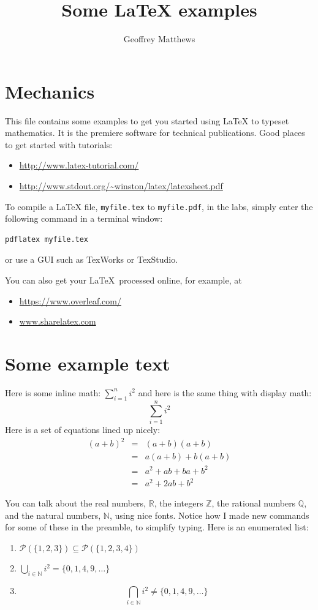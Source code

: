 \documentclass{article}
\title{Some \LaTeX{}  examples}
\author{Geoffrey Matthews}
\newcommand{\R}{\mathbb{R}}
\newcommand{\N}{\mathbb{N}}
\begin{document}
\maketitle

\section{Mechanics}
This file contains some examples to get you started using \LaTeX{} to
typeset mathematics.  It is the premiere software for technical
publications.  Good places to get started with tutorials:
\begin{itemize}
\item \url{http://www.latex-tutorial.com/}
\item \url{http://www.stdout.org/~winston/latex/latexsheet.pdf}
\end{itemize}

To compile a \LaTeX{} file, {\tt myfile.tex} to {\tt myfile.pdf}, 
in the labs, simply enter the
following command in a terminal window:
\begin{Verbatim}[frame=single]
pdflatex myfile.tex
\end{Verbatim}
or use a GUI such as TexWorks or TexStudio.

You can also get your \LaTeX\ processed online, for example, at
\begin{itemize}
\item \url{https://www.overleaf.com/}
\item \url{www.sharelatex.com}
\end{itemize}


\section{Some example text}
Here is some inline math:  $\sum_{i=1}^{n} i^2$ and
here is the same thing with display math:
\[
\sum_{i=1}^{n} i^2
\]
Here is a set of equations lined up nicely:
\begin{eqnarray*}
(a+b)^2 &=& (a+b)(a+b) \\
        &=& a(a+b) + b(a+b) \\
        &=& a^2 + ab + ba + b^2 \\
        &=& a^2 + 2ab + b^2
\end{eqnarray*}

You can talk about the real numbers, $\R$, the integers $\mathbb{Z}$, the
rational numbers $\mathbb{Q}$, and the natural numbers,
$\N$, using nice fonts.  Notice how I made new commands for some of these in
the preamble, to simplify typing.
Here is an enumerated list:
\begin{enumerate}

\item $\mathcal{P}(\{1,2,3\}) \subseteq \mathcal{P}(\{1,2,3,4\})$

\item
$
\bigcup_{i\in\N}i^2 = \{0,1,4,9,\ldots\}
$

\item
\[
\bigcap_{i\in\N}i^2 \not= \{0,1,4,9,\ldots\}
\]

\end{enumerate}
\end{document}
